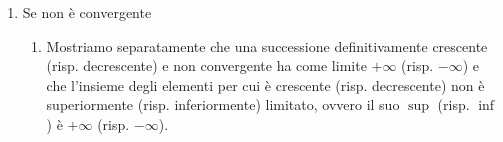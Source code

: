 \begin{demonstration}
\begin{enumerate}[label=(\roman*)]
\begin{enumerate}[label=\arabic*.]
            \item Se ne deduce quindi che \[
                \begin{cases}
                    \forall n \geq n_0 , x_n \leq p \quad\left(\text{risp. } x_n\geq p\right)\\
                    \forall \varepsilon>0, \exists n \geq n_0 \mid p-\varepsilon <x_n \leq p \quad\left(\text{risp. } p \leq x_n< p+\varepsilon\right)
                \end{cases}.
            \]

            \item Da cui \[
                \begin{cases}
                    \forall n\in\left\{n\in\mathbb{N}\mid n\geq n_0\right\}, x_n \leq p \quad\left(\text{risp. } x_n\geq p\right)\\
                    \forall \varepsilon>0, \exists n\in\left\{n\in\mathbb{N}\mid n\geq n_0\right\} \mid p-\varepsilon <x_n \leq p\quad\left(\text{risp. } p \leq x_n< p+\varepsilon\right)
                \end{cases},\]\[
                \begin{cases}
                    \forall x_i\in\left\{x_n\mid n\geq n_0\right\}, x_i \leq p \quad\left(\text{risp. } x_n\geq p\right)\\
                    \forall \varepsilon>0, \exists x_\varepsilon\in\left\{x_n\mid n\geq n_0\right\} \mid p-\varepsilon <x_\varepsilon \leq p\quad\left(\text{risp. } p \leq x_n< p+\varepsilon\right)
                \end{cases}.
            \]

            \item Di conseguenza per  e  segue necessariamente che$p = \sup\left\{x_n\mid n\geq n_0\right\}$ (risp. $\inf$).
        \end{enumerate}

        \item Se non è convergente
        \begin{enumerate}[label=\arabic*.]
            \item Mostriamo separatamente che una successione definitivamente crescente (risp. decrescente) e non convergente ha come limite $+\infty$ (risp. $-\infty$) e che l'insieme
            degli elementi per cui è crescente (risp. decrescente) non è superiormente (risp. inferiormente) limitato, ovvero il suo $\sup$ (risp. $\inf$) è $+\infty$ (risp. $-\infty$).


\end{enumerate}
\end{enumerate}
\end{demonstration}
